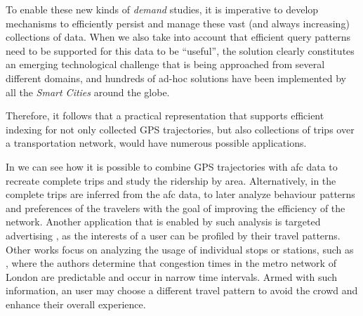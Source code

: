 \documentclass[a4paper,10pt,twoside]{book}
\begin{document}
	To enable these new kinds of \textit{demand} studies, it is imperative to develop mechanisms to efficiently persist and manage these vast (and always increasing) collections of data. When we also take into account that efficient query patterns need to be supported for this data to be ``useful'', the solution clearly constitutes an emerging technological challenge that is being approached from several different domains, and hundreds of ad-hoc solutions have been implemented by all the \textit{Smart Cities} around the globe.
	
	
	Therefore, it follows that a practical representation that supports efficient indexing for not only collected GPS trajectories, but also collections of trips over a transportation network, would have numerous possible applications. 
	
	In \cite{tu2018spatial} we can see how it is possible to combine GPS trajectories with \gls{afc} data to recreate complete trips and study the ridership by area. Alternatively, in \cite{weng2018mining} the complete trips are inferred from the \gls{afc} data, to later analyze behaviour patterns and preferences of the travelers with the goal of improving the efficiency of the network. Another application that is enabled by such analysis is targeted advertising \cite{zhang2017targeted}, as the interests of a user can be profiled by their travel patterns. Other works focus on analyzing the usage of individual stops or stations, such as \cite{ceapa2012avoiding}, where the authors determine that congestion times in the metro network of London are predictable and occur in narrow time intervals. Armed with such information, an user may choose a different travel pattern to avoid the crowd and enhance their overall experience. 
	
\end{document}
